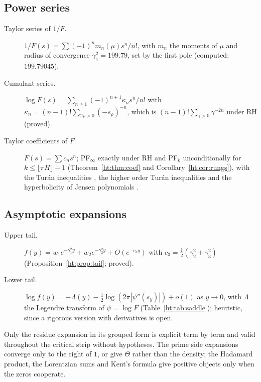 \subsection*{Power series}
\begin{description}
\item[Taylor series of $1/F$.] $1/F(s)=\sum(-1)^nm_n(\mu)s^n/n!$, with $m_n$ the moments of $\mu$ and radius of convergence $\gamma_1^2=199.79$, set by the first pole (computed: $199.79045$).
\item[Cumulant series.] $\log F(s)=\sum_{n\ge1}(-1)^{n+1}\kappa_ns^n/n!$ with $\kappa_n=(n-1)!\sum_{\Im\rho>0}(-s_\rho)^{-n}$, which is $(n-1)!\sum_{\gamma>0}\gamma^{-2n}$ under RH (proved).
\item[Taylor coefficients of $F$.] $F(s)=\sum c_ns^n$; PF$_\infty$ exactly under RH and PF$_k$ unconditionally for $k\le\lfloor\pi H\rfloor-1$ (Theorem~\ref{ht:thm:coef} and Corollary~\ref{ht:cor:rungs}), with the Tur\'an inequalities \cite{CNV86}, the higher order Tur\'an inequalities \cite{DL11} and the hyperbolicity of Jensen polynomials \cite{GORZ19}.
\end{description}

\subsection*{Asymptotic expansions}
\begin{description}
\item[Upper tail.] $f(y)=w_1e^{-\gamma_1^2y}+w_2e^{-\gamma_2^2y}+O(e^{-c_3y})$ with $c_3=\frac12(\gamma_2^2+\gamma_3^2)$ (Proposition~\ref{ht:prop:tail}; proved).
\item[Lower tail.] $\log f(y)=-\Lambda(y)-\frac12\log(2\pi|\psi''(s_y)|)+o(1)$ as $y\to0$, with $\Lambda$ the Legendre transform of $\psi=\log F$ (Table~\ref{ht:tab:saddle}); heuristic, since a rigorous version with derivatives is open.
\end{description}

Only the residue expansion in its grouped form is explicit term by term and valid throughout the critical strip without hypotheses. The prime side expansions converge only to the right of $1$, or give $\Theta$ rather than the density; the Hadamard product, the Lorentzian sums and Kent's formula give positive objects only when the zeros cooperate.
